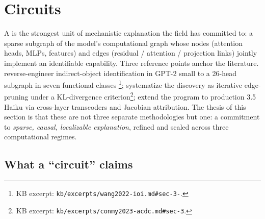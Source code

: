 
\section{Circuits}
\label{sec:circuits}

A \emph{} is the strongest unit of mechanistic explanation the
field has committed to: a sparse subgraph of the model's computational
graph whose nodes (attention heads, MLPs,  features) and edges
(residual / attention / projection links) jointly implement an
identifiable capability. Three reference points anchor the literature.
\citet{wang2022-ioi} reverse-engineer indirect-object identification in
GPT-2 small to a 26-head subgraph in seven functional classes
\citep[\S 3]{wang2022-ioi}\footnote{KB excerpt:
\texttt{kb/excerpts/wang2022-ioi.md\#sec-3-}.};
\citet{conmy2023-acdc} systematize the discovery as iterative
edge-pruning under a KL-divergence criterion\footnote{KB excerpt:
\texttt{kb/excerpts/conmy2023-acdc.md\#sec-3}.};
\citet{lindsey2025-circuit-tracing} extend the program to production
 3.5 Haiku via cross-layer transcoders and Jacobian attribution.
The thesis of this section is that these are not three separate
methodologies but one: a commitment to \emph{sparse, causal, localizable
explanation}, refined and scaled across three computational regimes.

\subsection{What a ``circuit'' claims}
\label{sec:circuit-claim}

